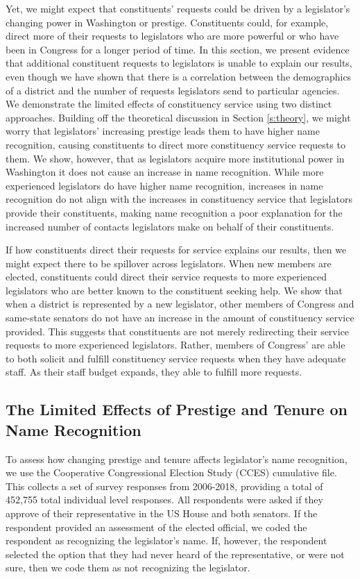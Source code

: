 \documentclass[12pt]{article}
\begin{document}
Yet, we might expect that constituents' requests could be driven by a legislator's changing power in Washington or prestige.  Constituents could, for example, direct more of their requests to legislators who are more powerful or who have been in Congress for a longer period of time.  In this section, we present evidence that additional constituent requests to legislators is unable to explain our results, even though we have shown that there is a correlation between the demographics of a district and the number of requests legislators send to particular agencies.  We demonstrate the limited effects of constituency service using two distinct approaches.  Building off the theoretical discussion in Section \ref{s:theory}, we might worry that legislators' increasing prestige leads them to have higher name recognition, causing constituents to direct more constituency service requests to them.  We show, however, that as legislators acquire more institutional power in Washington it does not cause an increase in name recognition.  While more experienced legislators do have higher name recognition, increases in name recognition do not align with the increases in constituency service that legislators provide their constituents, making name recognition a poor explanation for the increased number of contacts legislators make on behalf of their constituents.   

If how constituents direct their requests for service explains our results, then we might expect there to be spillover across legislators.  When new members are elected, constituents could direct their service requests to more experienced legislators who are better known to the constituent seeking help.  We show that when a district is represented by a new legislator, other members of Congress and same-state senators do not have an increase in the amount of constituency service provided.  This suggests that constituents are not merely redirecting their service requests to more experienced legislators.  Rather, members of Congress' are able to both solicit and fulfill constituency service requests when they have adequate staff.  As their staff budget expands, they able to fulfill more requests.  

\subsection{The Limited Effects of Prestige and Tenure on Name Recognition}
To assess how changing prestige and tenure affects legislator's name recognition, we use the Cooperative Congressional Election Study (CCES) cumulative file.  This collects a set of survey responses from 2006-2018, providing a total of 452,755 total individual level responses.  All respondents were asked if they approve of their representative in the US House and both senators.  If the respondent provided an assessment of the elected official, we coded the respondent as recognizing the legislator's name.  If, however, the respondent selected the option that they had never heard of the representative, or were not sure, then we code them as not recognizing the legislator.  
\end{document}
